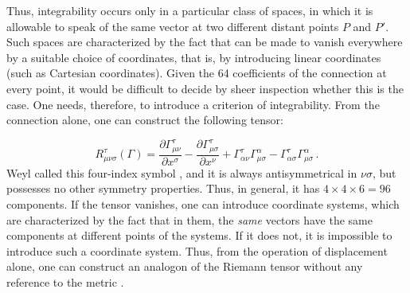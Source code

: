 \documentclass[final]{article}
\begin{document}
Thus, integrability occurs only in a particular class of spaces, in which it is allowable to speak of the same vector at two different distant points $P$ and $P'$. Such spaces are characterized by the fact that \Gtmn can be made to vanish everywhere by a suitable choice of coordinates, that is, by introducing linear coordinates (such as Cartesian coordinates). Given the 64 coefficients of the connection \Gtmn at every point, it would be difficult to decide by sheer inspection whether this is the case. One needs, therefore, to introduce a criterion of integrability. From the connection alone, one can construct the following tensor:

\begin{equation}\label{eq:riemanntensorgamma}
R_{\mu \nu \sigma}^{\tau}(\Gamma)=\frac{\partial \Gamma_{\mu \nu}^{\tau}}{\partial x^{\sigma}}-\frac{\partial \Gamma_{\mu \sigma}^{\tau}}{\partial x^{\nu}}+\Gamma_{\alpha \nu}^{\tau} \Gamma_{\mu \sigma}^{\alpha}-\Gamma_{\alpha \sigma}^{\tau} \Gamma_{\mu\sigma}^{\alpha}\,.	
\end{equation}
%
Weyl called this four-index symbol , and it is always antisymmetrical in $\nu\sigma$, but possesses no other symmetry properties. Thus, in general, it has $4 \times 4 \times 6=96$ components. If the tensor \ritea vanishes, one can introduce  coordinate systems, which are characterized by the fact that in them, the \emph{same} vectors have the same components at different points of the systems. If it does not, it is impossible to introduce such a  coordinate system. Thus, from the operation of displacement alone, one can construct an analogon of the Riemann tensor \riteg without any reference to the metric \gmn.
\end{document}

